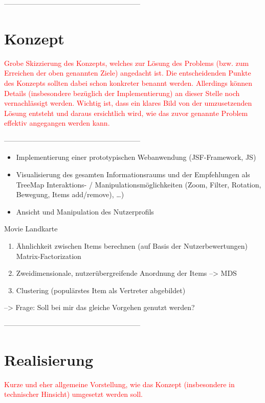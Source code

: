 \documentclass[ngerman, a4paper, abstract=false, twoside=false, parskip=half, DIV=12, bibtotoc]{scrartcl}
\begin{document}
---------------------------------------------------------

\section{Konzept}
\textcolor{red}{Grobe Skizzierung des Konzepts, welches zur Lösung des Problems (bzw. zum Erreichen der oben genannten Ziele) angedacht ist. Die entscheidenden Punkte des Konzepts sollten dabei schon konkreter benannt werden. Allerdings können Details (insbesondere bezüglich der Implementierung) an dieser Stelle noch vernachlässigt werden. Wichtig ist, dass ein klares Bild von der umzusetzenden Lösung entsteht und daraus ersichtlich wird, wie das zuvor genannte Problem effektiv angegangen werden kann.}

---------------------------------------------------------

\begin{itemize}
\item Implementierung einer prototypischen Webanwendung (JSF-Framework, JS)
\item Visualisierung des gesamten Informationsraums und der Empfehlungen als TreeMap Interaktions- / Manipulationsmöglichkeiten (Zoom, Filter, Rotation, Bewegung, Items add/remove), …)
\item Ansicht und Manipulation des Nutzerprofils
\end{itemize}

Movie Landkarte

\begin{enumerate}
\item Ähnlichkeit zwischen Items berechnen (auf Basis der Nutzerbewertungen)  Matrix-Factorization
\item Zweidimensionale, nutzerübergreifende Anordnung der Items --> MDS
\item Clustering (populärstes Item als Vertreter abgebildet)
\end{enumerate}

--> Frage: Soll bei mir das gleiche Vorgehen genutzt werden?

---------------------------------------------------------

\section{Realisierung}
\textcolor{red}{Kurze und eher allgemeine Vorstellung, wie das Konzept (insbesondere in technischer Hinsicht) umgesetzt werden soll.}
\end{document}
